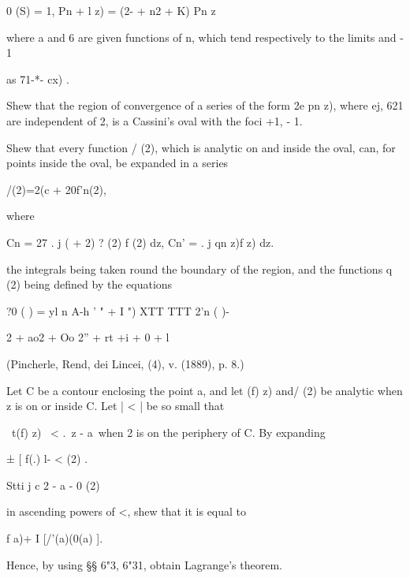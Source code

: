 \begin{wandwmiscexamples}
\begin{wandwmiscexample}
    0 (S) = 1, Pn + l z) = (2- + n2 + K) Pn z\

    where a and 6 are given functions of n, which tend respectively to the
    limits and - 1

    as 71-*- cx) .

    Shew that the region of convergence of a series of the form 2e pn z),
    where ej, 621  are independent of 2, is a Cassini's oval with the
    foci +1, - 1.

    Shew that every function / (2), which is analytic on and inside the
    oval, can, for points inside the oval, be expanded in a series

    /(2)=2(c + 20f'n(2),

    where

    Cn = 27 . j ( + 2) ? (2) f (2) dz, Cn' = . j qn z)f z) dz.

    the integrals being taken round the boundary of the region, and the
    functions q (2) being defined by the equations

    ?0 ( ) = yl n A-h ' " + I ") XTT TTT 2'n ( )-

    2 + ao2 + Oo 2'' + rt +i + 0 + l

    (Pincherle, Rend, dei Lincei, (4), v. (1889), p. 8.)
  \end{wandwmiscexample}
  \begin{wandwmiscexample}
    Let C be a contour enclosing the point a, and let (f) z) and/
    (2) be analytic when z is on or inside C. Let | < | be so small that

    \ t(f) z) \ < .\ z - a\ when 2 is on the periphery of C. By expanding

    ± [ f(.) l- < (2) .

    Stti j c 2 - a - 0 (2)

    in ascending powers of <, shew that it is equal to

    f a)+ I [/'(a)(0(a) ].

    Hence, by using §§ 6"3, 6"31, obtain Lagrange's theorem.
  \end{wandwmiscexample}
\end{wandwmiscexamples}